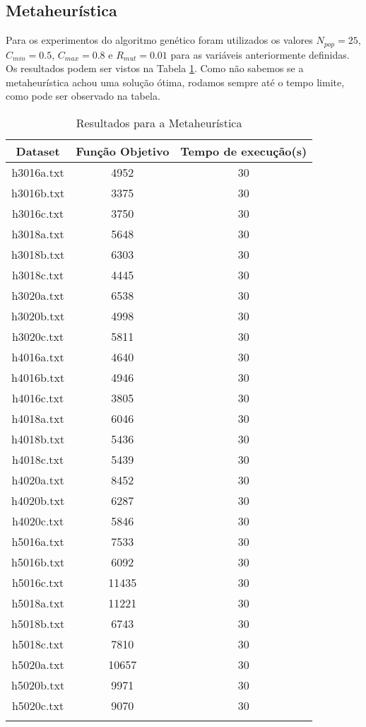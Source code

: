 \documentclass[a4paper,11pt]{article}
\begin{document}
\subsection{Metaheurística}
Para os experimentos do algoritmo genético foram utilizados os valores
$N_{pop} = 25$, $C_{min} = 0.5$, $C_{max} = 0.8$ e $R_{mut} = 0.01$
para as variáveis anteriormente definidas. Os resultados podem ser vistos na Tabela \ref{meta}.
Como não sabemos se a metaheurística achou uma solução ótima, rodamos sempre até o tempo limite,
como pode ser observado na tabela.

\begin{longtable}{c c c}
  Dataset & Função Objetivo & Tempo de execução(s) \\
  \hline
  \endhead
  h3016a.txt & 4952  & 30 \\
  h3016b.txt & 3375  & 30 \\
  h3016c.txt & 3750  & 30 \\
  h3018a.txt & 5648  & 30 \\
  h3018b.txt & 6303  & 30 \\
  h3018c.txt & 4445  & 30 \\
  h3020a.txt & 6538  & 30 \\
  h3020b.txt & 4998  & 30 \\
  h3020c.txt & 5811  & 30 \\
  h4016a.txt & 4640  & 30 \\
  h4016b.txt & 4946  & 30 \\
  h4016c.txt & 3805  & 30 \\
  h4018a.txt & 6046  & 30 \\
  h4018b.txt & 5436  & 30 \\
  h4018c.txt & 5439  & 30 \\
  h4020a.txt & 8452  & 30 \\
  h4020b.txt & 6287  & 30 \\
  h4020c.txt & 5846  & 30 \\
  h5016a.txt & 7533  & 30 \\
  h5016b.txt & 6092  & 30 \\
  h5016c.txt & 11435 & 30 \\
  h5018a.txt & 11221 & 30 \\
  h5018b.txt & 6743  & 30 \\
  h5018c.txt & 7810  & 30 \\
  h5020a.txt & 10657 & 30 \\
  h5020b.txt & 9971  & 30 \\
  h5020c.txt & 9070  & 30 \\
  \caption{Resultados para a Metaheurística}
  \label{meta}
\end{longtable}
\end{document}

